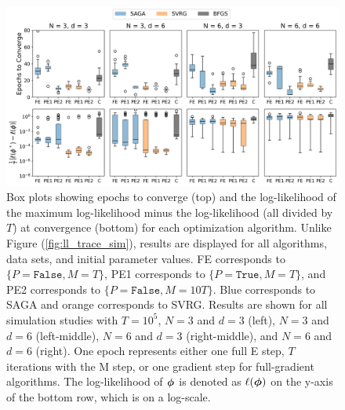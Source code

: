 \begin{figure}[h]
    \centering
    \includegraphics[width=6in]{../plt/boxplots_sim_T_100000.png}
    \caption{Box plots showing epochs to converge (top) and the log-likelihood of the maximum log-likelihood minus the log-likelihood (all divided by $T$) at convergence (bottom) for each optimization algorithm. Unlike Figure (\ref{fig:ll_trace_sim}), results are displayed for all algorithms, data sets, and initial parameter values. FE corresponds to $\{P = \texttt{False}, M = T\}$, PE1 corresponds to $\{P = \texttt{True}, M = T\}$, and PE2 corresponds to $\{P = \texttt{False}, M = 10T\}$. Blue corresponds to SAGA and orange corresponds to SVRG. Results are shown for all simulation studies with $T=10^{5}$, $N=3$ and $d=3$ (left), $N=3$ and $d=6$ (left-middle), $N=6$ and $d=3$ (right-middle), and $N=6$ and $d=6$ (right). One epoch represents either one full E step, $T$ iterations with the M step, or one gradient step for full-gradient algorithms. The log-likelihood of $\boldsymbol{\phi}$ is denoted as $\ell(\boldsymbol{\phi})$ on the y-axis of the bottom row, which is on a log-scale.}
    \label{fig:boxplots_sim}
\end{figure}
%
